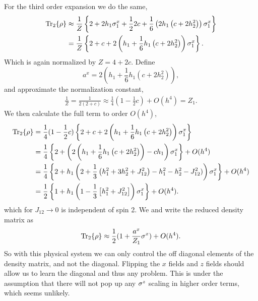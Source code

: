 \noindent For the third order expansion we do the same,
\begin{align*}
    \Tr_2\{\rho\} & \approx \frac{1}{Z} \left\{2 + 2 h_1 {\sigma^{x}_1} + \frac{1}{2} 2c+\frac{1}{6}\left(2h_1 \left(c  + 2 h_2^2 \right)\right){\sigma^{x}_1}\right\}\\
    & =  \frac{1}{Z} \left\{2 + c + 2 \left(h_1 + \frac{1}{6} h_1 \left(c  + 2 h_2^2 \right)\right){\sigma^{x}_1}\right\}.
\end{align*}
Which is again normalized by $Z = 4+2c$. Define
\begin{equation*}
    a^x = 2 \left(h_1 + \frac{1}{6} h_1 \left(c  + 2 h_2^2 \right)\right)\label{eq:ax_def} ,
\end{equation*}
and approximate the normalization constant,
\begin{align*}
    \frac{1}{Z} = \frac{1}{2(2+c)} \approx \frac{1}{4}(1 - \frac{1}{2}c) + O(h^4) = Z_1.
\end{align*}
We then calculate the full term to order $O(h^4)$,
\begin{align*}
    \Tr_2\{\rho\}& = \frac{1}{4}(1 - \frac{1}{2}c)\left\{2 + c + 2 \left(h_1 + \frac{1}{6} h_1 \left(c  + 2 h_2^2 \right)\right){\sigma^{x}_1}\right\}\\
    & = \frac{1}{4}\left\{2  +  \left(2\left(h_1 + \frac{1}{6} h_1 \left(c  + 2 h_2^2 \right)\right) -  c h_1 \right){\sigma^{x}_1}\right\} + O(h^4) \\ 
    & = \frac{1}{4}\left\{2  +  h_1 \left(2  + \frac{1}{3} \left(h_1^2 + 3h_2^2 + J_{12}^2 \right) -  h_1^2 -h_2^2 - J_{12}^2) \right){\sigma^{x}_1}\right\} + O(h^4)\\
    & = \frac{1}{2}\left\{1  +  h_1 \left(1  - \frac{1}{3} \left[h_1^2 + J_{12}^2 \right] \right){\sigma^{x}_1}\right\} + O(h^4).
\end{align*}
which for $J_{12}\to0$ is independent of spin 2. We and write the reduced density matrix as
\begin{equation*}
    \Tr_2\{\rho\} \approx \frac{1}{2}(1 + \frac{a^x}{Z_1} \sigma^x) + O(h^4).
\end{equation*}
So with this physical system we can only control the off diagonal elements of the density matrix, and not the diagonal. Flipping the $x$ fields and $z$ fields should allow us to learn the diagonal and thus any problem. This is under the assumption that there will not pop up any $\sigma^{z}$ scaling in higher order terms, which seems unlikely.\newline

